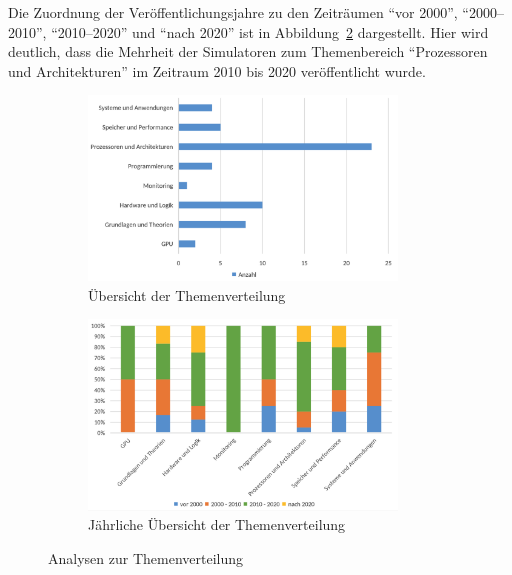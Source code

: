 Die Zuordnung der Veröffentlichungsjahre zu den Zeiträumen \enquote{vor 2000}, \enquote{2000--2010}, \enquote{2010--2020} und \enquote{nach 2020} ist in Abbildung~\ref{fig:8-thema-jahr} dargestellt. Hier wird deutlich, dass die Mehrheit der Simulatoren zum Themenbereich \enquote{Prozessoren und Architekturen} im Zeitraum 2010 bis 2020 veröffentlicht wurde.

\begin{figure}[!htbp]
    \centering
    \begin{subfigure}[b]{0.48\textwidth}
        \centering
        \includegraphics[width=0.90\textwidth]{graphics_sim/7-thema.png}
        \caption{Übersicht der Themenverteilung}
        \label{fig:7-thema}
    \end{subfigure}
    \hfill
    \begin{subfigure}[b]{0.48\textwidth}
        \centering
        \includegraphics[width=0.90\textwidth]{graphics_sim/8-thema-jahr.png}
        \caption{Jährliche Übersicht der Themenverteilung}
        \label{fig:8-thema-jahr}
    \end{subfigure}
    \caption{Analysen zur Themenverteilung}
    \label{fig:themen-gesamt}
\end{figure}

